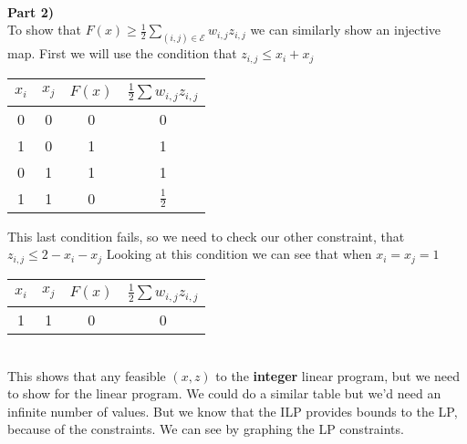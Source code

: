 \documentclass[12pt,letter]{article}
\newcommand{\ppart}[1]{\vspace{2mm}\large\textbf{\\Part {#1})\vspace{2mm}}\normalsize\\}
\begin{document}
%

\ppart{2}
To show that $F(x) \geq \frac12 \sum\limits_{(i,j)\in\mathcal{E}} w_{i,j}z_{i,j}$
we can similarly show an injective map.
First we will use the condition that $z_{i,j} \leq x_i + x_j$
\begin{figure*}[h!]
    \begin{center}
        \begin{tabular}{|c|c|c|c|}
            \hline
            $x_i$ & $x_j$ & $F(x)$ & $\frac12\sum w_{i,j}z_{i,j}$\\
            \hline
            0 & 0 & 0 & 0\\
            \hline
            1 & 0 & 1 & 1\\
            \hline
            0 & 1 & 1 & 1\\
            \hline
            1 & 1 & 0 & $\frac12$\\
            \hline
        \end{tabular}
    \end{center}
\end{figure*}
This last condition fails, so we need to check our other constraint, that
$z_{i,j} \leq 2 - x_i - x_j$
Looking at this condition we can see that when $x_i = x_j = 1$
\begin{figure*}[h!]
    \begin{center}
        \begin{tabular}{|c|c|c|c|}
            \hline
            $x_i$ & $x_j$ & $F(x)$ & $\frac12\sum w_{i,j}z_{i,j}$\\
            \hline
            1 & 1 & 0 & 0\\
            \hline
        \end{tabular}
    \end{center}
\end{figure*}
\\
This shows that any feasible $(x,z)$ to the \textbf{integer} linear program, but
we need to show for the linear program. We could do a similar table but we'd need
an infinite number of values. But we know that the ILP provides bounds to the LP,
because of the constraints. We can see by graphing the LP constraints.
\end{document}
